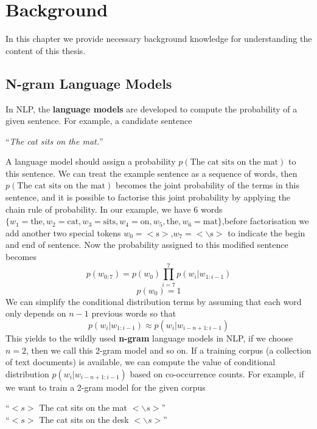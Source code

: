 \chapter{Background}
\label{chapterlabel1}
In this chapter we provide necessary background knowledge for understanding the content of this thesis. 
\section{N-gram Language Models}
In NLP, the \textbf{language models} are developed to compute the probability of a given sentence\cite{jurafsky2000speech}.
For example, a candidate sentence
\begin{center}
	``\emph{The cat sits on the mat.}''
\end{center}
A language model should assign a probability $p(\text{The cat sits on the mat})$ to this sentence.
We can treat the example sentence as a sequence of words, then $p(\text{The cat sits on the mat})$ becomes the joint probability of the terms in this sentence\cite{shannon2001mathematical}, and it is possible to factorise this joint probability by applying the chain rule of probability.
In our example, we have 6 words $\{w_{1} = \text{the}, w_{2} = \text{cat}, w_{3} = \text{sits}, w_{4} = \text{on}, w_{5}, \text{the}, w_{6} = \text{mat}\}$,before factorisation we add another two special tokens $w_{0} = <\text{s}>$,$w_{7} =<\backslash\text{s}>$ to indicate the begin and end of sentence. 
Now the probability assigned to this modified sentence becomes
\begin{equation}
p(w_{0:7}) = p(w_{0})\prod_{i=7}^{7}p(w_{i}|w_{1:i-1})
\end{equation}
\begin{equation}
p(w_{0}) = 1
\end{equation}
We can simplify the conditional distribution terms by assuming  that each word only depends on $n-1$ previous words so that
\begin{equation}
p(w_{i}|w_{1:i-1}) \approx p(w_{i}|w_{i-n+1:i-1})
\end{equation}
This yields to the wildly used \textbf{n-gram} language models in NLP\cite{jurafsky2000speech}, if we choose $n=2$, then we call this 2-gram model and so on.
If a training corpus (a collection of text documents) is available, 
we can compute the value of conditional distribution $p(w_{i}|w_{i-n+1:i-1})$ based on co-occurrence counts. For example, if we want to train a 2-gram model for the given corpus
\begin{center}
	``$<s>$ The cat sits on the mat $<\backslash s>$''\\
	``$<s>$ The cat sits on the desk $<\backslash s>$''
\end{center}
